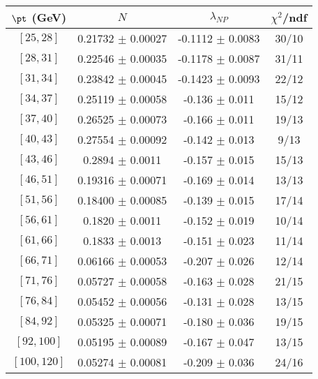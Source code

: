 \begin{tabular}{c||c|c|c}
$\pt$ (GeV) & $N$ & $\lambda_{NP}$ & $\chi^2$/ndf  \\
\hline
$[25, 28]$ & 0.21732 $\pm$ 0.00027 & -0.1112 $\pm$ 0.0083 & 30/10\\
$[28, 31]$ & 0.22546 $\pm$ 0.00035 & -0.1178 $\pm$ 0.0087 & 31/11\\
$[31, 34]$ & 0.23842 $\pm$ 0.00045 & -0.1423 $\pm$ 0.0093 & 22/12\\
$[34, 37]$ & 0.25119 $\pm$ 0.00058 & -0.136 $\pm$ 0.011 & 15/12\\
$[37, 40]$ & 0.26525 $\pm$ 0.00073 & -0.166 $\pm$ 0.011 & 19/13\\
$[40, 43]$ & 0.27554 $\pm$ 0.00092 & -0.142 $\pm$ 0.013 & 9/13\\
$[43, 46]$ & 0.2894 $\pm$ 0.0011 & -0.157 $\pm$ 0.015 & 15/13\\
$[46, 51]$ & 0.19316 $\pm$ 0.00071 & -0.169 $\pm$ 0.014 & 13/13\\
$[51, 56]$ & 0.18400 $\pm$ 0.00085 & -0.139 $\pm$ 0.015 & 17/14\\
$[56, 61]$ & 0.1820 $\pm$ 0.0011 & -0.152 $\pm$ 0.019 & 10/14\\
$[61, 66]$ & 0.1833 $\pm$ 0.0013 & -0.151 $\pm$ 0.023 & 11/14\\
$[66, 71]$ & 0.06166 $\pm$ 0.00053 & -0.207 $\pm$ 0.026 & 12/14\\
$[71, 76]$ & 0.05727 $\pm$ 0.00058 & -0.163 $\pm$ 0.028 & 21/15\\
$[76, 84]$ & 0.05452 $\pm$ 0.00056 & -0.131 $\pm$ 0.028 & 13/15\\
$[84, 92]$ & 0.05325 $\pm$ 0.00071 & -0.180 $\pm$ 0.036 & 19/15\\
$[92, 100]$ & 0.05195 $\pm$ 0.00089 & -0.167 $\pm$ 0.047 & 13/15\\
$[100, 120]$ & 0.05274 $\pm$ 0.00081 & -0.209 $\pm$ 0.036 & 24/16\\
\end{tabular}
